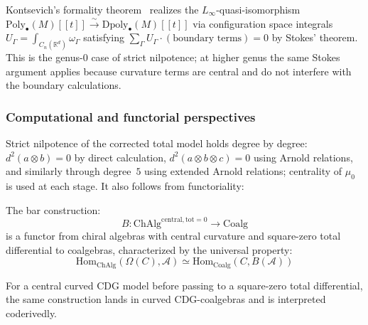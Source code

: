 Kontsevich's formality theorem~\cite{Kon03} realizes the
$L_\infty$-quasi-isomorphism
$\text{Poly}_{\bullet}(M)[[t]] \xrightarrow{\sim}
\text{Dpoly}_{\bullet}(M)[[t]]$
via configuration space integrals $U_\Gamma = \int_{C_n(\mathbb{R}^d)} \omega_\Gamma$
satisfying $\sum_\Gamma U_\Gamma \cdot (\text{boundary terms}) = 0$
by Stokes' theorem. This is the genus-$0$ case of strict
nilpotence; at higher genus the same Stokes argument applies
because curvature terms are central and do not interfere with the
boundary calculations.

\subsubsection{Computational and functorial perspectives}

Strict nilpotence of the corrected total model holds degree by degree:
$d^2(a \otimes b) = 0$
by direct calculation, $d^2(a \otimes b \otimes c) = 0$ using
Arnold relations, and similarly through degree~$5$ using extended
Arnold relations; centrality of $\mu_0$ is used at each stage.
It also follows from functoriality:

\begin{theorem}\label{thm:bar-functorial-grothendieck}
The bar construction:
\[B: \mathrm{ChAlg}^{\mathrm{central,tot=0}} \to \mathrm{Coalg}\]
is a functor from chiral algebras with central curvature and
square-zero total differential to coalgebras, characterized by the
universal property:
\[\mathrm{Hom}_{\mathrm{ChAlg}}(\Omega(C),\mathcal{A}) \simeq
\mathrm{Hom}_{\mathrm{Coalg}}(C,B(\mathcal{A}))\]

For a central curved CDG model before passing to a square-zero total
differential, the same construction lands in curved CDG-coalgebras
and is interpreted coderivedly.
\end{theorem}

